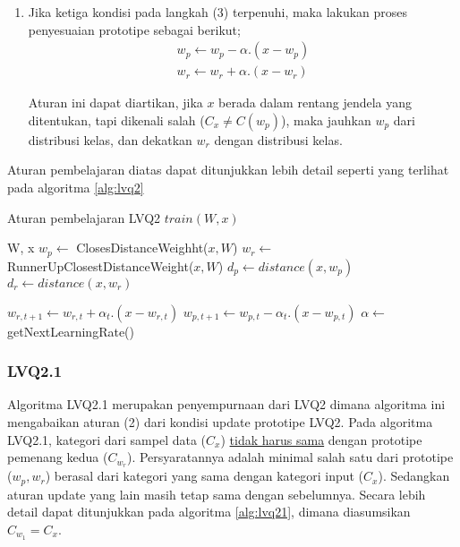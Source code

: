 \begin{enumerate}
  \item Jika ketiga kondisi pada langkah (3) terpenuhi, maka lakukan proses
  penyesuaian prototipe sebagai berikut;
  \begin{align}
  w_p \leftarrow w_p - \alpha . (x - w_p) \nonumber \\
  w_r \leftarrow w_r + \alpha . (x - w_r)
  \end{align}
  
  Aturan ini dapat diartikan, jika $x$ berada dalam rentang jendela yang
  ditentukan, tapi dikenali salah ($C_x \neq C(w_p)$), maka jauhkan $w_p$ dari
  distribusi kelas, dan dekatkan $w_r$ dengan distribusi kelas.
\end{enumerate}

\noindent 
Aturan pembelajaran diatas dapat ditunjukkan lebih detail seperti
yang terlihat pada algoritma \ref{alg:lvq2}

\begin{algorithm}  
\scriptsize 
\caption{Aturan pembelajaran LVQ2 $train(W, x)$}          
\label{alg:lvq2}                           
\begin{algorithmic}                    %
	\REQUIRE W, x
	\STATE $w_p \leftarrow $ ClosesDistanceWeighht($x, W$)
	\STATE $w_r \leftarrow $ RunnerUpClosestDistanceWeight($x, W$)
	\STATE $d_p \leftarrow distance(x, w_p)$
	\STATE $d_r \leftarrow distance(x, w_r)$
	
				\STATE $w_{r,t+1} \leftarrow w_{r,t} + \alpha_t . (x - w_{r,t})$
				\STATE $w_{p,t+1} \leftarrow w_{p,t} - \alpha_t . (x - w_{p,t})$
			\ENDIF
		\ENDIF
	\ENDIF
	\STATE $\alpha \leftarrow $ getNextLearningRate()
\end{algorithmic}
\end{algorithm}

\subsubsection*{LVQ2.1}
Algoritma LVQ2.1 merupakan penyempurnaan dari LVQ2 dimana algoritma ini
mengabaikan aturan (2) dari kondisi update prototipe LVQ2. Pada algoritma
LVQ2.1, kategori dari sampel data ($C_x$) \underline{tidak harus sama} dengan
prototipe pemenang kedua ($C_{w_r}$). Persyaratannya adalah minimal salah
satu dari prototipe ($w_p, w_r$) berasal dari kategori yang sama dengan kategori
input ($C_x$). Sedangkan aturan update yang lain masih tetap sama dengan
sebelumnya. Secara lebih detail dapat ditunjukkan pada algoritma
\ref{alg:lvq21}, dimana diasumsikan $C_{w_1} = C_x$.

